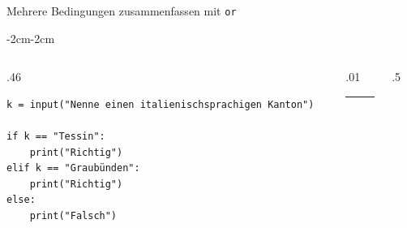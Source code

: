 \begin{frame}[fragile]{Mehrere Bedingungen zusammenfassen mit \lstinline|or|}
    \begin{adjustwidth}{-2cm}{-2cm}
        \begin{columns}
            \begin{column}{.46\pagewidth}
                \begin{lstlisting}[escapechar=!, basicstyle=\footnotesize\ttfamily]
k = input("Nenne einen italienischsprachigen Kanton")

if k == "Tessin":
    print("Richtig")
elif k == "Graubünden": 
    print("Richtig")
else:
    print("Falsch")
\end{lstlisting}
            \end{column}
            \begin{column}{.01\pagewidth}
                \rule{0.4pt}{\textheight}
            \end{column}
            \begin{column}{.5\pagewidth}
            \end{column}
        \end{columns}
    \end{adjustwidth}
\end{frame}

